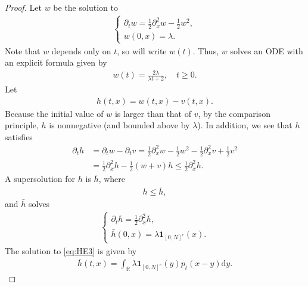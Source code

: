 \documentclass[10pt,a4paper]{amsart}
\newcommand{\R}{{\mathbb{R}}}
\renewcommand{\d}{\mathrm{d}}
\begin{document}
\begin{proof}
Let $w$ be the solution to 
\begin{align}\label{eq:HE2}
\begin{cases}
\partial_tw= \frac12 \partial_x^2 w -\frac12 w^2,\\
w(0, x)= \lambda.
\end{cases}
\end{align}
Note that $w$ depends only on $t$, so will write $w(t)$. Thus, $w$ solves an ODE with an explicit formula given by
\begin{align*}
w(t)= \frac{2\lambda}{\lambda t+2}, \quad t\geq0.
\end{align*}
Let 
\begin{align*}
h(t,x)= w(t,x)-v(t,x).
\end{align*}
Because the initial value of $w$ is larger than that of $v$, by the comparison principle, $h$ is nonnegative (and bounded above by $\lambda$). In addition,  we see that $h$ satisfies
\begin{align*}
\partial_t h &=\partial_t w-\partial_t v
=\frac12\partial_x^2 w-\frac12w^2-\frac12\partial_x^2v+\frac12v^2\\
&=\frac12\partial_x^2h-\frac12(w+v)h \leq \frac12\partial_x^2h.
\end{align*}
A supersolution for $h$ is $\bar{h}$, where
\begin{align}\label{eq:h}
h\leq \bar{h},
\end{align}
and $\bar{h}$ solves
\begin{align}\label{eq:HE3}
\begin{cases}
\partial_t \bar{h}=\frac12\partial_x^2\bar{h},\\
\bar{h}(0, x)= \lambda \bm{1}_{[0, N]^c}(x).
\end{cases}
\end{align}
The solution to \eqref{eq:HE3} is given by
\begin{align*}
\bar{h}(t,x)= \int_\R \lambda \bm{1}_{[0, N]^c}(y)p_t(x-y)\d y.
\end{align*}



\end{proof}
\end{document}
